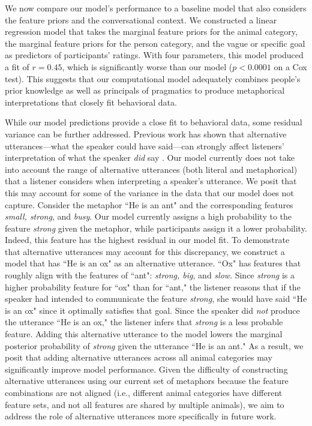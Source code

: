 \documentclass[10pt,letterpaper]{article}
\begin{document}
We now compare our model's performance to a baseline model that also considers the feature priors and the conversational context. We constructed a linear regression model that takes the marginal feature priors for the animal category, the marginal feature priors for the person category, and the vague or specific goal as predictors of participants' ratings. With four parameters, this model produced a fit of $r= 0.45$, which is significantly worse than our model ($p < 0.0001$ on a Cox test). This suggests that our computational model adequately combines people's prior knowledge as well as principals of pragmatics to produce metaphorical interpretations that closely fit behavioral data.

While our model predictions provide a close fit to behavioral data, some residual variance can be further addressed. Previous work has shown that alternative utterances---what the speaker could have said---can strongly affect listeners' interpretation of what the speaker \emph{did} say \cite{bergen2012s}. Our model currently does not take into account the range of alternative utterances (both literal and metaphorical) that a listener considers when interpreting a speaker's utterance. We posit that this may account for some of the variance in the data that our model does not capture. Consider the metaphor ``He is an ant" and the corresponding features \emph{small, strong}, and \emph{busy}. Our model currently assigns a high probability to the feature \emph{strong} given the metaphor, while participants assign it a lower probability. Indeed, this feature has the highest residual in our model fit. To demonstrate that alternative utterances may account for this discrepancy, we construct a model that has ``He is an ox" as an alternative utterance. ``Ox" has features that roughly align with the features of ``ant": \emph{strong, big}, and \emph{slow}. Since \emph{strong} is a higher probability feature for ``ox" than for ``ant," the listener reasons that if the speaker had intended to communicate the feature \emph{strong}, she would have said ``He is an ox" since it optimally satisfies that goal. Since the speaker did \emph{not} produce the utterance ``He is an ox," the listener infers that \emph{strong} is a less probable feature. Adding this alternative utterance to the model lowers the marginal posterior probability of \emph{strong} given the utterance ``He is an ant." As a result, we posit that adding alternative utterances across all animal categories may significantly improve model performance. Given the difficulty of constructing alternative utterances using our current set of metaphors because the feature combinations are not aligned (i.e., different animal categories have different feature sets, and not all features are shared by multiple animals), we aim to address the role of alternative utterances more specifically in future work.
\end{document}
